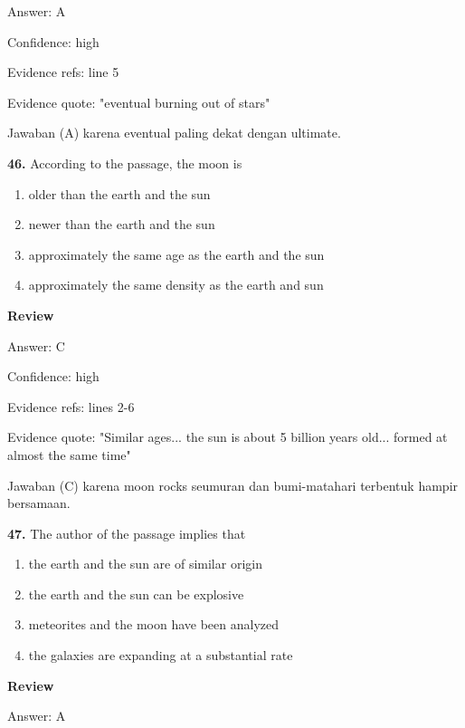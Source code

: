\documentclass[12pt]{article}
\begin{document}
Answer: A\par
Confidence: high\par
Evidence refs: line 5\par
Evidence quote: "eventual burning out of stars"\par
Jawaban (A) karena eventual paling dekat dengan ultimate.\par
\endgroup
\par
\vspace{0.25\baselineskip}
\noindent\textbf{46.} According to the passage, the moon is
\begin{enumerate}[label=(\Alph*),leftmargin=*,itemsep=0.2em]
\item older than the earth and the sun
\item newer than the earth and the sun
\item approximately the same age as the earth and the sun
\item approximately the same density as the earth and sun
\end{enumerate}
\par
\begingroup
\setlength{\parskip}{0pt}
\setlength{\parindent}{0pt}
\textbf{Review}\par
Answer: C\par
Confidence: high\par
Evidence refs: lines 2-6\par
Evidence quote: "Similar ages... the sun is about 5 billion years old... formed at almost the same time"\par
Jawaban (C) karena moon rocks seumuran dan bumi-matahari terbentuk hampir bersamaan.\par
\endgroup
\par
\vspace{0.25\baselineskip}
\noindent\textbf{47.} The author of the passage implies that
\begin{enumerate}[label=(\Alph*),leftmargin=*,itemsep=0.2em]
\item the earth and the sun are of similar origin
\item the earth and the sun can be explosive
\item meteorites and the moon have been analyzed
\item the galaxies are expanding at a substantial rate
\end{enumerate}
\par
\begingroup
\setlength{\parskip}{0pt}
\setlength{\parindent}{0pt}
\textbf{Review}\par
Answer: A\par
\end{document}
